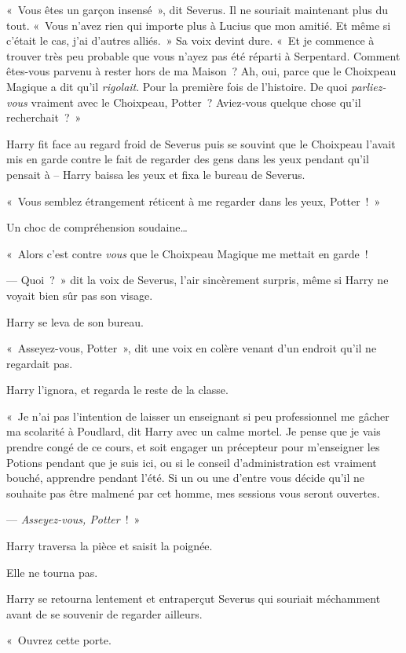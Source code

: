 «~Vous êtes un garçon insensé~», dit Severus.
Il ne souriait maintenant plus du tout.
«~Vous n'avez rien qui importe plus à Lucius que mon amitié.
Et même si c'était le cas, j'ai d'autres alliés.~»
Sa voix devint dure.
«~Et je commence à trouver très peu probable que vous n'ayez pas été réparti à Serpentard.
Comment êtes-vous parvenu à rester hors de ma Maison~?
Ah, oui, parce que le Choixpeau Magique a dit qu'il \emph{rigolait}.
Pour la première fois de l'histoire.
De quoi \emph{parliez-vous} vraiment avec le Choixpeau, Potter~?
Aviez-vous quelque chose qu'il recherchait~?~»

Harry fit face au regard froid de Severus puis se souvint que le Choixpeau l'avait mis en garde contre le fait de regarder des gens dans les yeux pendant qu'il pensait à -- Harry baissa les yeux et fixa le bureau de Severus.

«~Vous semblez étrangement réticent à me regarder dans les yeux, Potter~!~»

Un choc de compréhension soudaine…

«~Alors c'est contre \emph{vous} que le Choixpeau Magique me mettait en garde~!

--- Quoi~?~»
dit la voix de Severus, l'air sincèrement surpris, même si Harry ne voyait bien sûr pas son visage.

Harry se leva de son bureau.

«~Asseyez-vous, Potter~», dit une voix en colère venant d'un endroit qu'il ne regardait pas.

Harry l'ignora, et regarda le reste de la classe.

«~Je n'ai pas l'intention de laisser un enseignant si peu professionnel me gâcher ma scolarité à Poudlard, dit Harry avec un calme mortel.
Je pense que je vais prendre congé de ce cours, et soit engager un précepteur pour m'enseigner les Potions pendant que je suis ici, ou si le conseil d'administration est vraiment bouché, apprendre pendant l'été.
Si un ou une d'entre vous décide qu'il ne souhaite pas être malmené par cet homme, mes sessions vous seront ouvertes.

--- \emph{Asseyez-vous, Potter}~!~»

Harry traversa la pièce et saisit la poignée.

Elle ne tourna pas.

Harry se retourna lentement et entraperçut Severus qui souriait méchamment avant de se souvenir de regarder ailleurs.

«~Ouvrez cette porte.

